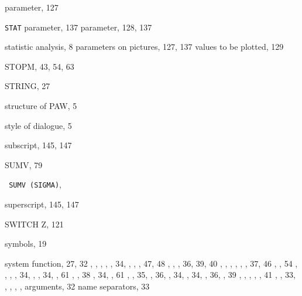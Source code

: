\begin{theindex}
     parameter, 127
  \item {\tt STAT}
     parameter, 137
     parameter, 128, 137
  \item statistic
    \subitem analysis, 8
    \subitem parameters on pictures, 127, 137
    \subitem values to be plotted, 129
  \item {\ttfamily  STOPM}, 43, 54, 63
  \item {\ttfamily  STRING}, 27
  \item structure of PAW, 5
  \item style of dialogue, 5
  \item subscript, 145, 147
  \item {\ttfamily  SUMV}, 79
  \item \texttt  { SUMV \textrm  {(SIGMA)}}, 
  \item superscript, 145, 147
  \item SWITCH
    \subitem Z, 121
  \item symbols, 19
  \item system function, 27, 32
    , 
    , 
    , 
    , 
    , 34, 
    , 
    , , 47, 48
    , 
    , , 36, 39, 40
    , 
    , 
    , 
    , 
    , , 37, 46
    , , 54
    , 
    , 
    , 
    , 34, 
    , 
    , 34, , 61
    , , 38
    , 34, , 61
    , 
    , 35, 
    , 36, 
    , 34, 
    , 34, 
    , 36, , 39
    , 
    , 
    , 
    , , 41
    , 
    , 33, 
    , 
    , 
    , 
    , 
    \subitem arguments, 32
    \subitem name separators, 33


\end{theindex}
